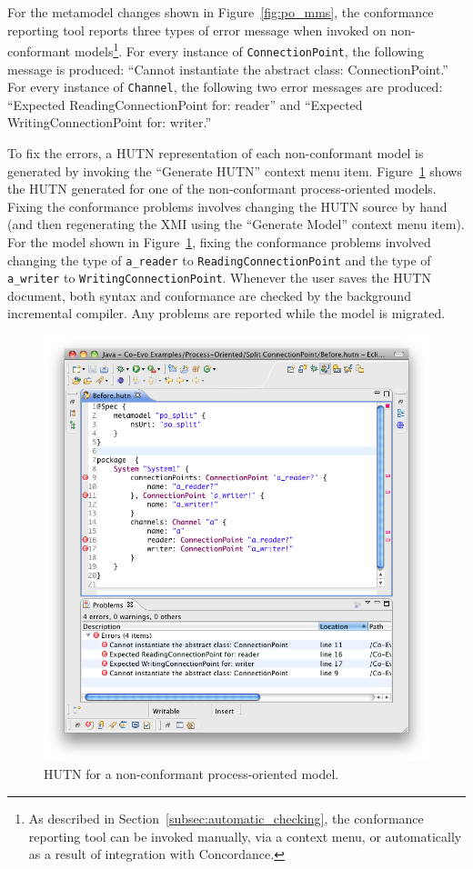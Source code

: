 For the metamodel changes shown in Figure~\ref{fig:po_mms}, the conformance reporting tool reports three types of error message when invoked on non-conformant models\footnote{As described in Section~\ref{subsec:automatic_checking}, the conformance reporting tool can be invoked manually, via a context menu, or automatically as a result of integration with Concordance.}. For every instance of \texttt{Co\-nn\-ec\-ti\-o\-nPo\-i\-nt}, the following message is produced: ``Cannot instantiate the abstract class: ConnectionPoint.'' For every instance of \texttt{Ch\-an\-n\-el}, the following two error messages are produced: ``Expected ReadingConnectionPoint for: reader'' and ``Expected WritingConnectionPoint for: writer.''

To fix the errors, a HUTN representation of each non-conformant model is generated by invoking the ``Generate HUTN'' context menu item. Figure~\ref{fig:po_hutn} shows the HUTN generated for one of the non-conformant process-oriented models. Fixing the conformance problems involves changing the HUTN source by hand (and then regenerating the XMI using the ``Generate Model'' context menu item). For the model shown in Figure~\ref{fig:po_hutn}, fixing the conformance problems involved changing the type of \texttt{a\_reader} to \texttt{Re\-ad\-i\-ngCo\-nn\-ec\-ti\-o\-nPo\-i\-nt} and the type of \texttt{a\_writer} to \texttt{Wr\-i\-ti\-ngCo\-nn\-ec\-ti\-o\-nPo\-i\-nt}. Whenever the user saves the HUTN document, both syntax and conformance are checked by the background incremental compiler. Any problems are reported while the model is migrated.

\begin{figure}[htbp]
  \centering
  \includegraphics[width=13.5cm]{6.Evaluation/images/po_hutn.png}
  \caption{HUTN for a non-conformant process-oriented model.}
  \label{fig:po_hutn}
\end{figure}

